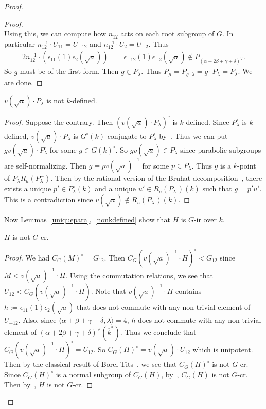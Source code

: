 \begin{proof}
\begin{proof}
\begin{equation*}
\end{equation*}
Using this, we can compute how $n_{12}$ acts on each root subgroup of $G$. In particular $n_{12}^{-1}\cdot U_{11}=U_{-12}$ and $n_{12}^{-1}\cdot U_{2}= U_{-2}$. Thus
\begin{alignat*}{2}
n_{12}^{-1}\cdot (\epsilon_{11}(1)\epsilon_{2}(\sqrt a)) &= \epsilon_{-12}(1)\epsilon_{-2}(\sqrt a)\notin P_{(\alpha+2\beta+\gamma+\delta)^{\vee}}.
\end{alignat*}
So $g$ must be of the first form. Then $g\in P_\lambda$. Thus $P_\mu=P_{g\cdot \lambda}=g\cdot P_\lambda=P_\lambda$. We are done.
\end{proof}

\begin{lem}\label{nonkdefined}
$v(\sqrt a)\cdot P_\lambda$ is not $k$-defined.
\end{lem}
\begin{proof}
Suppose the contrary. Then $(v(\sqrt a)\cdot P_\lambda)^{\circ}$ is $k$-defined. Since $P_\lambda^{\circ}$ is $k$-defined, $v(\sqrt a)\cdot P_\lambda$ is $G^{\circ}(k)$-conjugate to $P_\lambda^{\circ}$ by~\cite[Thm.~20.9]{Borel-AG-book}. Thus we can put $g v(\sqrt a)\cdot P_\lambda^{\circ}$ for some $g\in G(k)^{\circ}$. So $g v(\sqrt a)\in P_\lambda^{\circ}$ since parabolic subgroups are self-normalizing. Then $g=pv(\sqrt a)^{-1}$ for some $p\in P_\lambda^{\circ}$. Thus $g$ is a $k$-point of $P_\lambda^{\circ} R_u(P_\lambda^{-})$. Then by the rational version of the Bruhat decomposition~\cite[Thm.~21.15]{Borel-AG-book}, there exists a unique $p'\in P_\lambda^{\circ}(k)$ and a unique $u'\in R_u(P_\lambda^{-})(k)$ such that $g=p' u'$. This is a contradiction since $v(\sqrt a)\notin R_u(P_\lambda^{-})(k)$. 
\end{proof} 
Now Lemmas~\ref{uniquepara},~\ref{nonkdefined} show that $H$ is $G$-ir over $k$. 

\begin{lem}\label{nonG-cr}
$H$ is not $G$-cr. 
\end{lem}
\begin{proof}
We had $C_G(M)^{\circ}=G_{12}$. Then $C_G(v(\sqrt a)^{-1}\cdot H)^{\circ}<G_{12}$ since $M<v(\sqrt a)^{-1}\cdot H$. Using the commutation relations, we see that $U_{12}< C_G(v(\sqrt a)^{-1}\cdot H)$. Note that $v(\sqrt a)^{-1}\cdot H$ contains $h:=\epsilon_{11}(1)\epsilon_{2}(\sqrt a)$ that does not commute with any non-trivial element of $U_{-12}$. Also, since $\langle \alpha+\beta+\gamma+\delta, \lambda\rangle = 4$,  $h$ does not commute with any non-trivial element of $(\alpha+2\beta+\gamma+\delta)^{\vee}(\overline k^*)$.
Thus we conclude that $C_G(v(\sqrt a)^{-1}\cdot H)^{\circ}=U_{12}$. So $C_G(H)^{\circ}=v(\sqrt a)\cdot U_{12}$ which is unipotent. Then by the classical result of Borel-Tits~\cite[Prop.~3.1]{Borel-Tits-unipotent-invent}, we see that $C_G(H)^{\circ}$ is not $G$-cr.
Since $C_G(H)^{\circ}$ is a normal subgroup of $C_G(H)$, by~\cite[Ex.~5.20]{Bate-uniform-TransAMS}, $C_G(H)$ is not $G$-cr. Then by~\cite[Cor.~3.17]{Bate-geometric-Inventione}, $H$ is not $G$-cr. 
\end{proof}
\end{proof}

